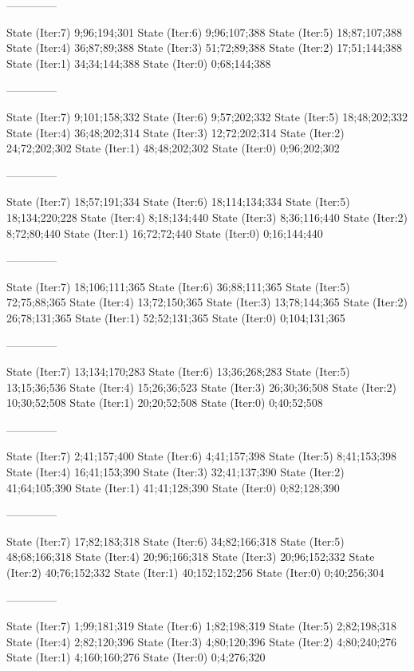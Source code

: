 \documentclass[a4paper,10pt,ngerman]{scrartcl}
\begin{document}
\begin{lstcs}
--------------

State (Iter:7) {9;96;194;301}
State (Iter:6) {9;96;107;388}
State (Iter:5) {18;87;107;388}
State (Iter:4) {36;87;89;388}
State (Iter:3) {51;72;89;388}
State (Iter:2) {17;51;144;388}
State (Iter:1) {34;34;144;388}
State (Iter:0) {0;68;144;388}

--------------

State (Iter:7) {9;101;158;332}
State (Iter:6) {9;57;202;332}
State (Iter:5) {18;48;202;332}
State (Iter:4) {36;48;202;314}
State (Iter:3) {12;72;202;314}
State (Iter:2) {24;72;202;302}
State (Iter:1) {48;48;202;302}
State (Iter:0) {0;96;202;302}

--------------

State (Iter:7) {18;57;191;334}
State (Iter:6) {18;114;134;334}
State (Iter:5) {18;134;220;228}
State (Iter:4) {8;18;134;440}
State (Iter:3) {8;36;116;440}
State (Iter:2) {8;72;80;440}
State (Iter:1) {16;72;72;440}
State (Iter:0) {0;16;144;440}

--------------

State (Iter:7) {18;106;111;365}
State (Iter:6) {36;88;111;365}
State (Iter:5) {72;75;88;365}
State (Iter:4) {13;72;150;365}
State (Iter:3) {13;78;144;365}
State (Iter:2) {26;78;131;365}
State (Iter:1) {52;52;131;365}
State (Iter:0) {0;104;131;365}

--------------

State (Iter:7) {13;134;170;283}
State (Iter:6) {13;36;268;283}
State (Iter:5) {13;15;36;536}
State (Iter:4) {15;26;36;523}
State (Iter:3) {26;30;36;508}
State (Iter:2) {10;30;52;508}
State (Iter:1) {20;20;52;508}
State (Iter:0) {0;40;52;508}

--------------

State (Iter:7) {2;41;157;400}
State (Iter:6) {4;41;157;398}
State (Iter:5) {8;41;153;398}
State (Iter:4) {16;41;153;390}
State (Iter:3) {32;41;137;390}
State (Iter:2) {41;64;105;390}
State (Iter:1) {41;41;128;390}
State (Iter:0) {0;82;128;390}

--------------

State (Iter:7) {17;82;183;318}
State (Iter:6) {34;82;166;318}
State (Iter:5) {48;68;166;318}
State (Iter:4) {20;96;166;318}
State (Iter:3) {20;96;152;332}
State (Iter:2) {40;76;152;332}
State (Iter:1) {40;152;152;256}
State (Iter:0) {0;40;256;304}

--------------

State (Iter:7) {1;99;181;319}
State (Iter:6) {1;82;198;319}
State (Iter:5) {2;82;198;318}
State (Iter:4) {2;82;120;396}
State (Iter:3) {4;80;120;396}
State (Iter:2) {4;80;240;276}
State (Iter:1) {4;160;160;276}
State (Iter:0) {0;4;276;320}


\end{lstcs}
\end{document}
